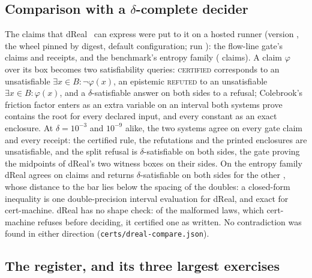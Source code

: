 \documentclass[preprint,11pt,a4paper]{elsarticle}
\theoremstyle{definition}
\newcommand{\verdict}[1]{\textup{\textsc{#1}}}
\newcommand{\CERT}{\verdict{certified}}
\newcommand{\REFT}{\verdict{refuted}}
\begin{document}
\subsection{Comparison with a \texorpdfstring{$\delta$}{delta}-complete decider}\label{sec:dreal}

The claims that dReal~\citep{GaoAvigadClarke12,dReal13} can express were put to it on a hosted runner (version \MtDrVersion, the wheel pinned by digest, default configuration; run \MtDrRun): the flow-line gate's \MtDrGateClaims{} claims and \MtDrReceiptsWord{} receipts, and the benchmark's entropy family (\MtDrEntropy{} claims). A claim $\varphi$ over its box becomes two satisfiability queries: \CERT{} corresponds to an unsatisfiable $\exists x\in B\colon\neg\varphi(x)$, an epistemic \REFT{} to an unsatisfiable $\exists x\in B\colon\varphi(x)$, and a $\delta$-satisfiable answer on both sides to a refusal; Colebrook's friction factor enters as an extra variable on an interval both systems prove contains the root for every declared input, and every constant as an exact enclosure. At $\delta=10^{-3}$ and $10^{-9}$ alike, the two systems agree on every gate claim and every receipt: the certified rule, the refutations and the printed enclosures are unsatisfiable, and the split refusal is $\delta$-satisfiable on both sides, the gate proving the midpoints of dReal's two witness boxes on their sides. On the entropy family dReal agrees on \MtDrEntropyAgreeWord{} claims and returns $\delta$-satisfiable on both sides for the other \MtDrEntropyWeakerWord, whose distance to the bar lies below the spacing of the doubles: a closed-form inequality is one double-precision interval evaluation for dReal, and exact for cert-machine. dReal has no shape check: of the \MtDrEntropyDoorWord{} malformed laws, which cert-machine refuses before deciding, it certified one as written. No contradiction was found in either direction (\texttt{certs/dreal-compare.json}).

\subsection{The register, and its three largest exercises}\label{sec:register}
\end{document}

